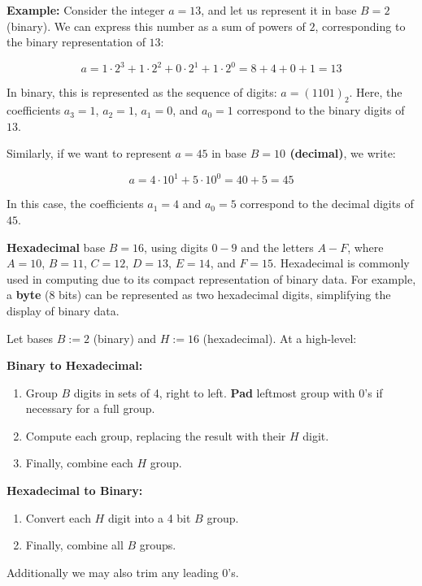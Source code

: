 \noindent
\textbf{Example:} Consider the integer $a = 13$, and let us represent it in base $B = 2$ (binary). We can express this number as a sum of powers of $2$, corresponding to the binary representation of $13$:
    
\[
a = 1 \cdot 2^3 + 1 \cdot 2^2 + 0 \cdot 2^1 + 1 \cdot 2^0 = 8 + 4 + 0 + 1 = 13
\]

\noindent
In binary, this is represented as the sequence of digits: $a = (1101)_2$. Here, the coefficients $a_3 = 1$, $a_2 = 1$, $a_1 = 0$, and $a_0 = 1$ correspond to the binary digits of $13$.

\noindent
Similarly, if we want to represent $a = 45$ in base \textbf{$B = 10$ (decimal)}, we write:

\[
a = 4 \cdot 10^1 + 5 \cdot 10^0 = 40 + 5 = 45
\]

\noindent
In this case, the coefficients $a_1 = 4$ and $a_0 = 5$ correspond to the decimal digits of $45$.


\begin{Def}[Hexadecimal]
    
        \textbf{Hexadecimal} base $B=16$, using digits $0-9$ and the letters $A-F$, where $A=10$, $B=11$, $C=12$, $D=13$, $E=14$, and $F=15$. Hexadecimal is commonly used in computing due to its compact representation of binary data. For example, a \textbf{byte} (8 bits) can be represented as two hexadecimal digits, simplifying the display of binary data.
\end{Def}


\begin{theo}

    Let bases \( B:=2 \) (binary) and \( H:=16 \) (hexadecimal). At a high-level:

    \vspace{.5em}
    
    \noindent \textbf{Binary to Hexadecimal:}
    \begin{enumerate}
        \item Group $B$ digits in sets of 4, right to left. \textbf{Pad} leftmost group with 0's if necessary for a full group.
        \item Compute each group, replacing the result with their $H$ digit.
        \item Finally, combine each $H$ group.
    \end{enumerate}
    
    \noindent \textbf{Hexadecimal to Binary:}
    \begin{enumerate}
        \item Convert each $H$ digit into a 4 bit $B$ group.
        \item Finally, combine all $B$ groups.
    \end{enumerate}
    \noindent
    Additionally we may also trim any leading 0's.
\end{theo}

